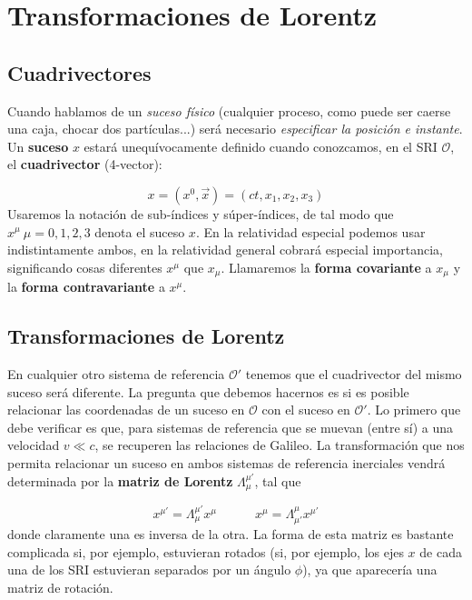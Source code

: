 \documentclass[12pt,a4paper]{book}
\numberwithin{equation}{section}
\numberwithin{figure}{section}
\newcommand{\tquad}{\quad \quad \quad}
\begin{document}
\section{Transformaciones de Lorentz}
 \subsection{Cuadrivectores}


Cuando hablamos de un \textit{suceso físico} (cualquier proceso, como puede ser caerse una caja, chocar dos partículas...) será necesario \textit{especificar la posición e instante}. Un \textbf{suceso} $x$ estará unequívocamente definido cuando conozcamos, en el SRI $\mathcal{O}$, el  \textbf{cuadrivector} (4-vector):

\begin{equation}
x = (x^0, \vec{x}) = (ct,x_1,x_2,x_3)
\end{equation}
Usaremos la notación de sub-índices y súper-índices, de tal modo que $x^\mu \ \mu=0,1,2,3$ denota el suceso $x$. En la relatividad especial podemos usar indistintamente ambos, en la relatividad general cobrará especial importancia, significando cosas diferentes $x^\mu$ que $x_\mu$. Llamaremos la \textbf{forma covariante} a $x_{\mu}$ y la \textbf{forma contravariante} a $x^{\mu}$. \\

\subsection{Transformaciones de Lorentz}

En cualquier otro sistema de referencia $\mathcal{O}'$ tenemos que el cuadrivector del mismo suceso será diferente. La pregunta que debemos hacernos es si es posible relacionar las coordenadas de un suceso en $\mathcal{O}$ con el suceso en $\mathcal{O}'$. Lo primero que debe verificar es que, para sistemas de referencia que se muevan (entre sí) a una velocidad $v\ll c$, se recuperen las relaciones de Galileo. La transformación que nos permita relacionar un suceso en ambos sistemas de referencia inerciales vendrá determinada por la \textbf{matriz de Lorentz} $\Lambda_\mu^{\mu'}$, tal que 

\begin{equation}
x^{\mu'} = \Lambda_\mu^{\mu'} x^{\mu}  \tquad 
x^{\mu} = \Lambda_{\mu'}^{\mu} x^{\mu'} 
\end{equation}
donde claramente una es inversa de la otra. La forma de esta matriz es bastante complicada si, por ejemplo, estuvieran rotados (si, por ejemplo, los ejes $x$ de cada una de los SRI estuvieran separados por un ángulo $\phi$), ya que aparecería una matriz de rotación. \\
\end{document}
